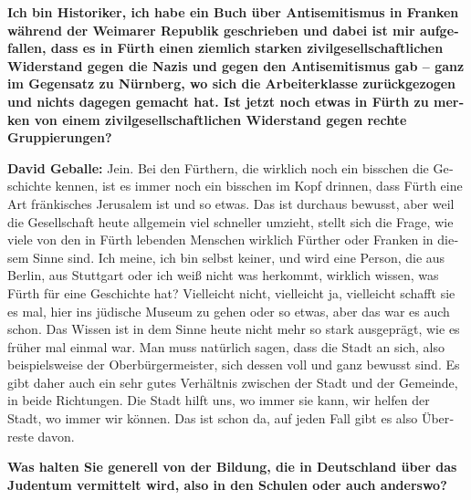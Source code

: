 \begin{otherlanguage}{ngerman}
\textbf{Ich bin Historiker, ich habe ein Buch über Antisemitismus in Franken während der Weimarer Republik geschrieben und dabei ist mir aufgefallen, dass es in Fürth einen ziemlich starken zivilgesellschaftlichen Widerstand gegen die Nazis und gegen den Antisemitismus gab – ganz im Gegensatz zu Nürnberg, wo sich die Arbeiterklasse zurückgezogen und nichts dagegen gemacht hat. Ist jetzt noch etwas in Fürth zu merken von einem zivilgesellschaftlichen Widerstand gegen rechte Gruppierungen?} 

\textbf{David Geballe:} Jein. Bei den Fürthern, die wirklich noch ein bisschen die Geschichte kennen, ist es immer noch ein bisschen im Kopf drinnen, dass Fürth eine Art fränkisches Jerusalem ist und so etwas. Das ist durchaus bewusst, aber weil die Gesellschaft heute allgemein viel schneller umzieht, stellt sich die Frage, wie viele von den in Fürth lebenden Menschen wirklich Fürther oder Franken in diesem Sinne sind. Ich meine, ich bin selbst keiner, und wird eine Person, die aus Berlin, aus Stuttgart oder ich weiß nicht was herkommt, wirklich wissen, was Fürth für eine Geschichte hat? Vielleicht nicht, vielleicht ja, vielleicht schafft sie es mal, hier ins jüdische Museum zu gehen oder so etwas, aber das war es auch schon. Das Wissen ist in dem Sinne heute nicht mehr so stark ausgeprägt, wie es früher mal einmal war. Man muss natürlich sagen, dass die Stadt an sich, also beispielsweise der Oberbürgermeister, sich dessen voll und ganz bewusst sind. Es gibt daher auch ein sehr gutes Verhältnis zwischen der Stadt und der Gemeinde, in beide Richtungen. Die Stadt hilft uns, wo immer sie kann, wir helfen der Stadt, wo immer wir können. Das ist schon da, auf jeden Fall gibt es also Überreste davon. 



\textbf{Was halten Sie generell von der Bildung, die in Deutschland über das Judentum vermittelt wird, also in den Schulen oder auch anderswo?} 


\end{otherlanguage}
